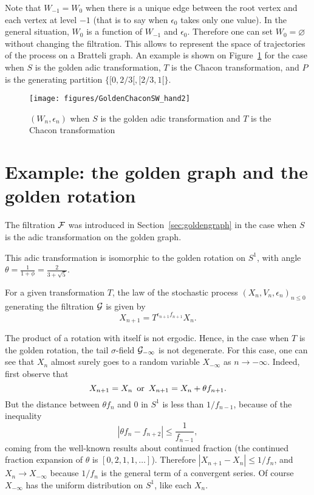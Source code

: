 \documentclass[12pt,a4paper]{article}
\begin{document}
Note that $W_{-1}=W_0$ when there is a unique edge between the root vertex and each vertex at 
level $-1$ (that is to say when $\epsilon_0$ takes only one value). 
In the general situation,  $W_0$ is a function of $W_{-1}$ and $\epsilon_0$. 
Therefore one can set $W_0=\varnothing$ without changing the filtration. 
This allows to represent the space of trajectories of the process 
on a Bratteli graph. 
An example is shown on Figure~\ref{fig:GoldenChacon} for the case when 
$S$ is the golden adic transformation, $T$ is the Chacon transformation, 
and $P$ is the generating partition $\{[0,2/3[, [2/3, 1[\}$.  

\begin{figure}[!h]
\centering
	\texttt{[image: figures/GoldenChaconSW\_hand2]}
\caption{$(W_n,\epsilon_n)$ when $S$ is the golden adic transformation and $T$ is the Chacon transformation}
\label{fig:GoldenChacon}
\end{figure}



\section{Example: the golden graph and the golden rotation}

The filtration $\mathcal{F}$ was introduced in Section~\ref{sec:goldengraph}
in the case when $S$ is the adic transformation on the golden graph. 

This adic transformation  
is isomorphic to the golden rotation on $S^1$, 
with angle $\theta=\frac{1}{1+\phi}=\frac{2}{3+\sqrt{5}}$. 

For a given transformation $T$, the law of the stochastic process 
${(X_n, V_n, \epsilon_n)}_{n \leq 0}$ generating the filtration $\mathcal{G}$ 
is given by 
$$
X_{n+1} = T^{\epsilon_{n+1}f_{n+1}}X_n.
$$

The product of a rotation with itself is not ergodic. 
Hence, in the case when $T$ is the golden rotation, the tail $\sigma$-field 
$\mathcal{G}_{-\infty}$ is not degenerate. 
For this case, one can see that $X_n$ almost surely goes to a random variable $X_{-\infty}$ 
as $n \to -\infty$.  
Indeed, first observe that
$$
X_{n+1} = X_n \, \text{ or\, $X_{n+1} = X_n + \theta f_{n+1}$}. 
$$
But the distance between $\theta f_n$ and $0$ in $S^1$ is less than 
$1/f_{n-1}$, because of the inequality
$$
|\theta f_n - f_{n+2}| \leq \frac{1}{f_{n-1}},
$$
coming from the well-known results about continued fraction 
(the continued fraction expansion of $\theta$ is $[0, 2, 1, 1, \ldots]$). 
Therefore $|X_{n+1} - X_n| \leq 1/f_{n}$, and $X_n \to X_{-\infty}$ because 
$1/f_{n}$ is the general term of a convergent series. 
Of course $X_{-\infty}$ has the uniform distribution on $S^1$, like each $X_n$.
\end{document}
